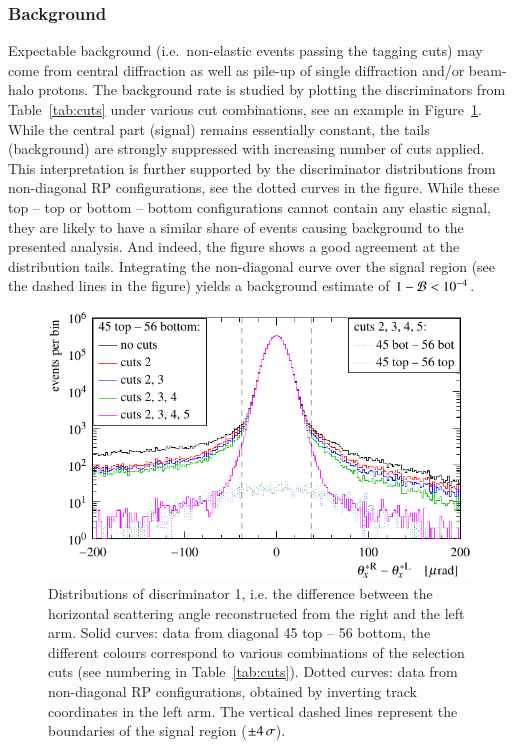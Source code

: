 
\subsubsection{Background}
\label{sec:background}

Expectable background (i.e.~non-elastic events passing the tagging cuts) may come from central diffraction as well as pile-up of single diffraction and/or beam-halo protons. The background rate is studied by plotting the discriminators from Table~\ref{tab:cuts} under various cut combinations, see an example in Figure~\ref{fig:background}. While the central part (signal) remains essentially constant, the tails (background) are strongly suppressed with increasing number of cuts applied. This interpretation is further supported by the discriminator distributions from non-diagonal RP configurations, see the dotted curves in the figure. While these top -- top or bottom -- bottom configurations cannot contain any elastic signal, they are likely to have a similar share of events causing background to the presented analysis. And indeed, the figure shows a good agreement at the distribution tails. Integrating the non-diagonal curve over the signal region (see the dashed lines in the figure) yields a background estimate of $1 - {\cal B} < 10^{-4}$.


\begin{figure}
\begin{center}
\includegraphics{fig/cut_distributions.pdf}
\caption{%
Distributions of discriminator 1, i.e. the difference between the horizontal scattering angle reconstructed from the right and the left arm. Solid curves: data from diagonal 45 top -- 56 bottom, the different colours correspond to various combinations of the selection cuts (see numbering in Table~\ref{tab:cuts}). Dotted curves: data from non-diagonal RP configurations, obtained by inverting track coordinates in the left arm. The vertical dashed lines represent the boundaries of the signal region ($\pm 4\,{\rm \sigma}$).
}
\label{fig:background}
\end{center}
\end{figure}

